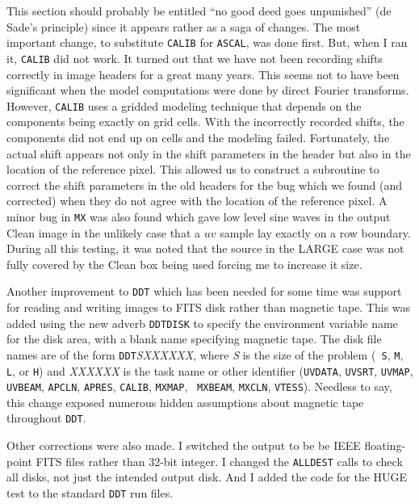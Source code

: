 This section should probably be entitled ``no good deed goes
unpunished'' (de Sade's principle) since it appears rather as a saga
of changes.  The most important change, to substitute {\tt CALIB} for
{\tt ASCAL}, was done first.  But, when I ran it, {\tt CALIB} did not
work.  It turned out that we have not been recording shifts correctly
in image headers for a great many years.  This seems not to have been
significant when the model computations were done by direct Fourier
transforms.  However, {\tt CALIB} uses a gridded modeling technique
that depends on the components being exactly on grid cells.  With the
incorrectly recorded shifts, the components did not end up on cells
and the modeling failed.  Fortunately, the actual shift appears not
only in the shift parameters in the header but also in the location of
the reference pixel.  This allowed us to construct a subroutine to
correct the shift parameters in the old headers for the bug which we
found (and corrected) when they do not agree with the location of the
reference pixel.  A minor bug in {\tt MX} was also found which gave
low level sine waves in the output Clean image in the unlikely case
that a $uv$ sample lay exactly on a row boundary.  During all this
testing, it was noted that the source in the LARGE case was not fully
covered by the Clean box being used forcing me to increase it size.

Another improvement to {\tt DDT} which has been needed for some time
was support for reading and writing images to FITS disk rather than
magnetic tape.  This was added using the new adverb {\tt DDTDISK} to
specify the environment variable name for the disk area, with a blank
name specifying magnetic tape.  The disk file names are of the form
{\tt DDT}{\it SXXXXXX}, where {\it S} is the size of the problem ({\tt
S}, {\tt M}, {\tt L}, or {\tt H}) and {\it XXXXXX} is the task name or
other identifier ({\tt UVDATA}, {\tt UVSRT}, {\tt UVMAP}, {\tt
UVBEAM}, {\tt APCLN}, {\tt APRES}, {\tt CALIB}, {\tt MXMAP}, {\tt
MXBEAM}, {\tt MXCLN}, \hbox{{\tt VTESS}}).  Needless to say, this
change exposed numerous hidden assumptions about magnetic tape
throughout \hbox{{\tt DDT}}.

Other corrections were also made.  I switched the output to be be
IEEE floating-point FITS files rather than 32-bit integer.  I changed
the {\tt ALLDEST} calls to check all disks, not just the intended
output disk.  And I added the code for the HUGE test to the standard
{\tt DDT} run files.


